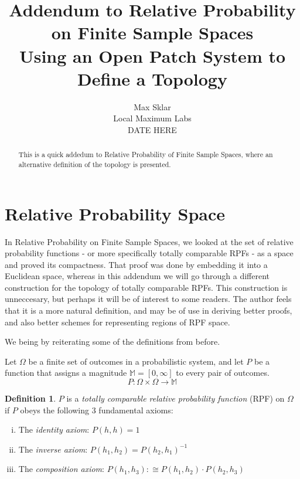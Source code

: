 \documentclass[twoside]{article}
\theoremstyle{plain}%
\theoremstyle{definition}
\newtheorem{definition}{Definition}[section]
\theoremstyle{remark}
\begin{document}
\parindent=0in
\parskip=12pt


\title{
  Addendum to Relative Probability on Finite Sample Spaces \\
  \large{
    Using an Open Patch System to Define a Topology
  }
}

\author{Max Sklar\\ Local Maximum Labs \\ DATE HERE}
\date{}

\maketitle
\thispagestyle{empty}

\begin{abstract}
This is a quick addedum to Relative Probability of Finite Sample Spaces, where an alternative definition of the topology is presented.
\end{abstract}

\section{Relative Probability Space}
\label{section:new_relative_prob}

In Relative Probability on Finite Sample Spaces\cite{paper}, we looked at the set of relative probability functions - or more specifically totally comparable RPFs - as a space and proved its compactness. That proof was done by embedding it into a Euclidean space, whereas in this addendum we will go through a different construction for the topology of totally comparable RPFs. This construction is unneccesary, but perhaps it will be of interest to some readers. The author feels that it is a more natural definition, and may be of use in deriving better proofs, and also better schemes for representing regions of RPF space.

We being by reiterating some of the definitions from before\cite{paper}.

Let \(\Omega\) be a finite set of outcomes in a probabilistic system, and let \(P\) be a function that assigns a magnitude \(\mathbb{M} = [0, \infty]\) to every pair of outcomes.
\[P: \Omega \times \Omega \rightarrow \mathbb{M}\]

\begin{definition}
\label{def:fundamental_laws}
\(P\) is a \textit{totally comparable relative probability function} (RPF) on \(\Omega\) if \(P\) obeys the following 3 fundamental axioms:

\begin{enumerate}[(i)]
\item The \textit{identity axiom}: \(P(h, h) = 1\)
\item The \textit{inverse axiom}: \(P(h_1, h_2) = P(h_2, h_1)^{-1}\)
\item The \textit{composition axiom}: \(P(h_1, h_3) :\cong P(h_1, h_2) \cdot P(h_2, h_3)\)
\end{enumerate}

\end{definition}
\end{document}
